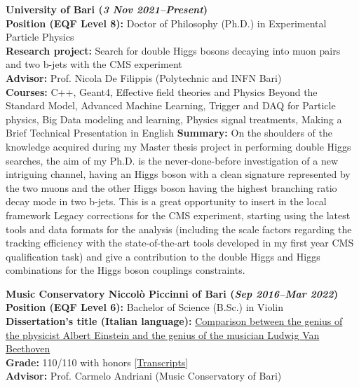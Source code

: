 \documentclass[11pt]{res}
\begin{document}
\begin{resume}
\textbf{University of Bari (\textit{3 Nov 2021--Present})}\\
\textbf{Position (EQF Level 8):} Doctor of Philosophy (Ph.D.) in Experimental Particle Physics\\
\textbf{Research project:}
Search for double Higgs bosons decaying into muon pairs and two b-jets with the CMS experiment\\
\textbf{Advisor:} Prof. Nicola De Filippis (Polytechnic and INFN Bari)\\
\textbf{Courses:} C++, Geant4, Effective field theories and Physics Beyond the Standard Model, Advanced Machine Learning, Trigger and DAQ for Particle physics, Big Data modeling and learning, Physics signal treatments, Making a Brief Technical Presentation in English
\textbf{Summary:} On the shoulders of the knowledge acquired during my Master thesis project in performing double Higgs searches, the aim of my Ph.D. is the never-done-before investigation of a new intriguing channel, having an Higgs boson with a clean signature represented by the two muons and the other Higgs boson having the highest branching ratio decay mode in two b-jets. This is a great opportunity to insert in the local framework Legacy corrections for the CMS experiment, starting using the latest tools and data formats for the analysis (including the scale factors regarding the tracking efficiency with the state-of-the-art tools developed in my first year CMS qualification task) and give a contribution to the double Higgs and Higgs combinations for the Higgs boson couplings constraints.

\textbf{Music Conservatory Niccolò Piccinni of Bari (\textit{Sep 2016--Mar 2022})}\\
\textbf{Position (EQF Level 6):} Bachelor of Science (B.Sc.) in Violin\\
\textbf{Dissertation's title (Italian language):}
\href{https://drive.google.com/file/d/1D4PbAL-X92U5CsQO8JGemSHA03GEtdu0/view?usp=share_link}{Comparison between the genius of the physicist Albert Einstein and the genius of the musician Ludwig Van Beethoven}\\
\textbf{Grade:} 110/110 with honors [\href{https://drive.google.com/file/d/1aV1ERPqgSpQ-9SRbWIpw-Q4BkuS1kvyy/view?usp=share_link}{Transcripts}]\\
\textbf{Advisor:} Prof. Carmelo Andriani (Music Conservatory of Bari)


\end{resume}
\end{document}
